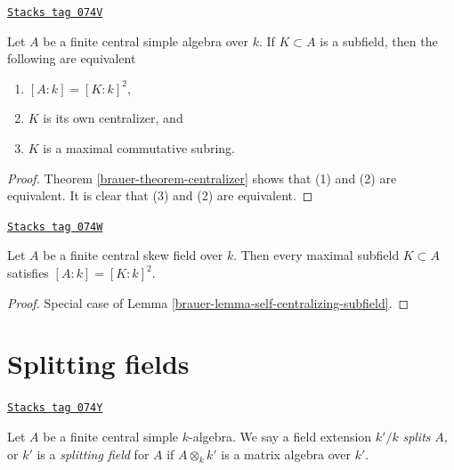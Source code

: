\begin{lemma}
\label{brauer-lemma-self-centralizing-subfield}
\href{https://stacks.math.columbia.edu/tag/074V}{\texttt{Stacks tag 074V}}

Let $A$ be a finite central simple algebra over $k$.
If $K \subset A$ is a subfield, then the following are equivalent
\begin{enumerate}
\item $[A : k] = [K : k]^2$,
\item $K$ is its own centralizer, and
\item $K$ is a maximal commutative subring.
\end{enumerate}
\end{lemma}

\begin{proof}

Theorem \ref{brauer-theorem-centralizer}
shows that (1) and (2) are equivalent.
It is clear that (3) and (2) are equivalent.
\end{proof}

\begin{lemma}
\label{brauer-lemma-maximal-subfield}
\href{https://stacks.math.columbia.edu/tag/074W}{\texttt{Stacks tag 074W}}


Let $A$ be a finite central skew field over $k$.
Then every maximal subfield $K \subset A$ satisfies
$[A : k] = [K : k]^2$.
\end{lemma}

\begin{proof}

Special case of Lemma \ref{brauer-lemma-self-centralizing-subfield}.
\end{proof}

\section{Splitting fields}
\label{brauer-section-splitting}
\begin{definition}[Splitting]
\label{brauer-definition-splitting}
\href{https://stacks.math.columbia.edu/tag/074Y}{\texttt{Stacks tag 074Y}}

Let $A$ be a finite central simple $k$-algebra.
We say a field extension $k'/k$ {\it splits} $A$, or
$k'$ is a {\it splitting field} for $A$ if $A \otimes_k k'$ is
a matrix algebra over $k'$.
\end{definition}


